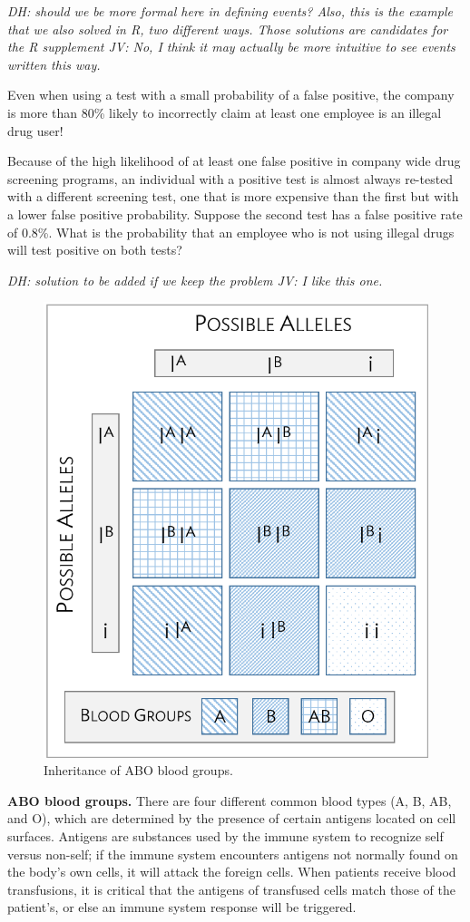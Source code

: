 \begin{doublespace}
\begin{example}
   \textit{DH: should we be more formal here in defining events? Also, this is the example that we also solved in R, two different ways.  Those solutions are candidates for the R supplement JV: No, I think it may actually be more intuitive to see events written this way.}

Even when using a test with a small probability of a false positive, the company is more than 80\% likely to incorrectly claim at least one employee is an illegal drug user!

\end{example}

\begin{exercise}
Because of the high likelihood of at least one false positive in company wide drug screening programs, an individual with a positive test is almost always re-tested with a different screening test, one that is more expensive than the first but with a lower false positive probability.  Suppose the second test has a false positive rate of 0.8\%.  What is the probability that an employee who is not using illegal drugs will test positive on both tests?

\textit{DH: solution to be added if we keep the problem JV: I like this one.}

\end{exercise}

\begin{figure}[h]
	\centering
	\includegraphics[height= 0.65\textwidth]{ch_probability_oi_biostat/figures/aboInheritance/aboInheritance.png}
	\caption{Inheritance of ABO blood groups.}
	\label{fig:aboInheritance}
\end{figure}

\begin{example}{\textbf{ABO blood groups.} There are four different common blood types (A, B, AB, and O), which are determined by the presence of certain antigens located on cell surfaces. Antigens are substances used by the immune system to recognize self versus non-self; if the immune system encounters antigens not normally found on the body's own cells, it will attack the foreign cells. When patients receive blood transfusions, it is critical that the antigens of transfused cells match those of the patient's, or else an immune system response will be triggered.
		
}
\end{example}
\end{doublespace}
